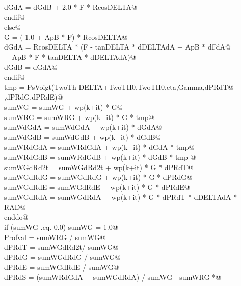 \documentclass[10pt,a4paper,notitlepage]{article}
\begin{document}
\begin{flushleft}
\begin{list}{}{}
\mbox{}\verb@              dGdA = dGdB + 2.0 * F * RcosDELTA@\\
\mbox{}\verb@            endif@\\
\mbox{}\verb@          else@\\
\mbox{}\verb@            G = (-1.0 + ApB * F) * RcosDELTA@\\
\mbox{}\verb@            dGdA = RcosDELTA * (F - tanDELTA * dDELTAdA + ApB * dFdA@\\
\mbox{}               + ApB * F * tanDELTA * dDELTAdA)@\\
\mbox{}\verb@            dGdB = dGdA@\\
\mbox{}\verb@          endif@\\
\mbox{}\verb@          tmp = PsVoigt(TwoTh-DELTA+TwoTH0,TwoTH0,eta,Gamma,dPRdT@\\
\mbox{}          ,dPRdG,dPRdE)@\\
\mbox{}\verb@          sumWG = sumWG + wp(k+it) * G@\\
\mbox{}\verb@          sumWRG = sumWRG + wp(k+it) * G * tmp@\\
\mbox{}\verb@          sumWdGdA = sumWdGdA + wp(k+it) * dGdA@\\
\mbox{}\verb@          sumWdGdB = sumWdGdB + wp(k+it) * dGdB@\\
\mbox{}\verb@          sumWRdGdA = sumWRdGdA + wp(k+it) * dGdA * tmp@\\
\mbox{}\verb@          sumWRdGdB = sumWRdGdB + wp(k+it) * dGdB * tmp @\\
\mbox{}\verb@          sumWGdRd2t = sumWGdRd2t + wp(k+it) * G * dPRdT@\\
\mbox{}\verb@          sumWGdRdG = sumWGdRdG + wp(k+it) * G * dPRdG@\\
\mbox{}\verb@          sumWGdRdE = sumWGdRdE + wp(k+it) * G * dPRdE@\\
\mbox{}\verb@          sumWGdRdA = sumWGdRdA + wp(k+it) * G * dPRdT * dDELTAdA * RAD@\\
\mbox{}\verb@        enddo@\\
\mbox{}\verb@        if (sumWG .eq. 0.0) sumWG = 1.0@\\
\mbox{}\verb@        Profval = sumWRG / sumWG@\\
\mbox{}\verb@        dPRdT = sumWGdRd2t/ sumWG@\\
\mbox{}\verb@        dPRdG = sumWGdRdG / sumWG@\\
\mbox{}\verb@        dPRdE = sumWGdRdE / sumWG@\\
\mbox{}\verb@        dPRdS = (sumWRdGdA + sumWGdRdA) / sumWG - sumWRG *@\\

\end{list}
\end{flushleft}
\end{document}
